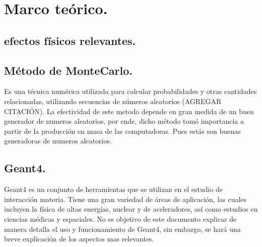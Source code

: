 \chapter{Marco teórico.}

\section{efectos físicos relevantes.}


\section{Método de MonteCarlo.}

Es una técnica numérica utilizada para calcular probabilidades y otras cantidades relacionadas, utilizando secuencias de números aleatorios (AGREGAR CITACIÓN). La efectividad de este metodo depende en gran medida de un buen generador de numeros aleatorios, por ende, dicho método tomó importancia a partir de la producción en masa de las computadoras. Pues estás son buenas generadoras de numeros aleatorios. 

\section{Geant4.}
Geant4 es un conjunto de herramientas que se utilizan en el estudio de interacción materia. Tiene una gran variedad de áreas de aplicación, las cuales incluyen la física de altas energías, nuclear y de aceleradores, así como estudios en ciencias médicas y espaciales. No es objetivo de este documento explicar de manera detalla el uso y funcionamiento de Geant4, sin embargo, se hará una breve explicación de los aspectos mas relevantes.



